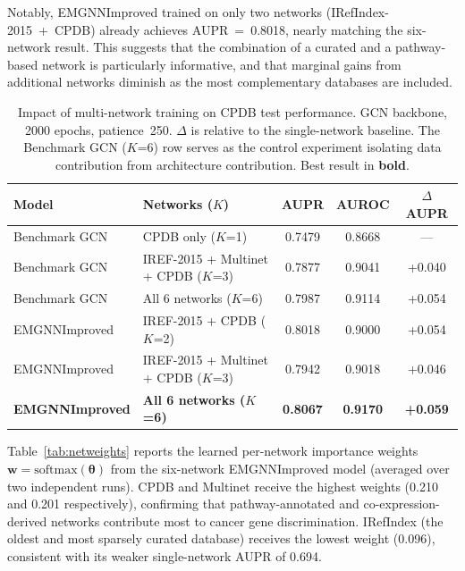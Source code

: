 Notably, EMGNNImproved trained on only two networks (IRefIndex-2015~+~CPDB) already
achieves AUPR~=~0.8018, nearly matching the six-network result. This suggests that the
combination of a curated and a pathway-based network is particularly informative, and that
marginal gains from additional networks diminish as the most complementary databases are
included.

\begin{table}[ht]
  \centering
  \caption{Impact of multi-network training on CPDB test performance. GCN backbone,
           2000 epochs, patience~250. $\Delta$ is relative to the single-network baseline.
           The Benchmark GCN ($K$=6) row serves as the control experiment isolating data
           contribution from architecture contribution. Best result in \textbf{bold}.}
  \label{tab:multinetwork}
  \small
  \begin{tabular}{llccc}
    \toprule
    \textbf{Model} & \textbf{Networks ($K$)} & \textbf{AUPR} & \textbf{AUROC} & \textbf{$\Delta$ AUPR} \\
    \midrule
    Benchmark GCN    & CPDB only ($K$=1)                   & 0.7479 & 0.8668 & ---    \\
    Benchmark GCN    & IREF-2015 + Multinet + CPDB ($K$=3) & 0.7877 & 0.9041 & +0.040 \\
    Benchmark GCN    & All 6 networks ($K$=6)               & 0.7987 & 0.9114 & +0.054 \\
    EMGNNImproved    & IREF-2015 + CPDB ($K$=2)             & 0.8018 & 0.9000 & +0.054 \\
    EMGNNImproved    & IREF-2015 + Multinet + CPDB ($K$=3)  & 0.7942 & 0.9018 & +0.046 \\
    \textbf{EMGNNImproved} & \textbf{All 6 networks ($K$=6)} & \textbf{0.8067} & \textbf{0.9170} & \textbf{+0.059} \\
    \bottomrule
  \end{tabular}
\end{table}

Table~\ref{tab:netweights} reports the learned per-network importance weights
$\mathbf{w} = \text{softmax}(\boldsymbol{\theta})$ from the six-network EMGNNImproved model
(averaged over two independent runs). CPDB and Multinet receive the highest weights
(0.210 and 0.201 respectively), confirming that pathway-annotated and co-expression-derived
networks contribute most to cancer gene discrimination. IRefIndex (the oldest and most
sparsely curated database) receives the lowest weight (0.096), consistent with its weaker
single-network AUPR of 0.694.

